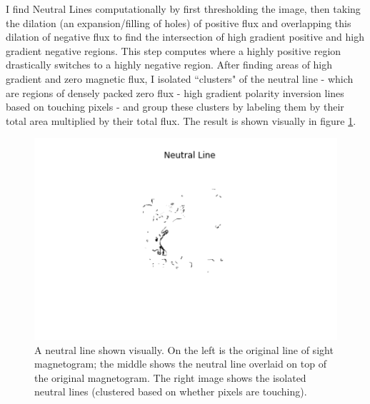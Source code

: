 \documentclass[defaultstyle,11pt]{thesis}
\begin{document}
I find Neutral Lines computationally by first thresholding the image, then taking the dilation (an expansion/filling of holes) of positive flux and overlapping this dilation of negative flux to find the intersection of high gradient positive and high gradient negative regions. This step computes where a highly positive region drastically switches to a highly negative region. After finding areas of high gradient and zero magnetic flux, I isolated ``clusters" of the neutral line - which are regions of densely packed zero flux - high gradient polarity inversion lines based on touching pixels - and group these clusters by labeling them by their total area multiplied by their total flux. The result is shown visually in figure \ref{fig:neutralline}.
\begin{figure}[h]
\centering
\includegraphics[width=0.5\linewidth]{ThesisFilePkg/figures/data/neutralline.png}
\caption{A neutral line shown visually. On the left is the original line of sight magnetogram; the middle shows the neutral line overlaid on top of the original magnetogram. The right image shows the isolated neutral lines (clustered based on whether pixels are touching).}
\label{fig:neutralline}
\end{figure}
\end{document}
